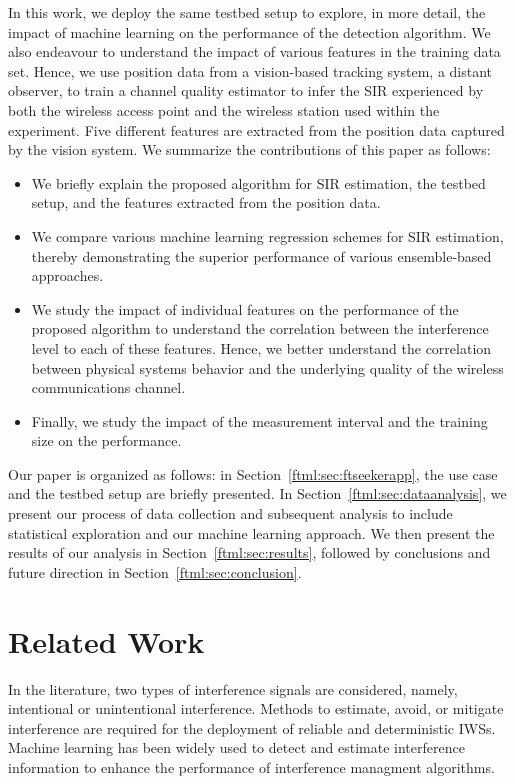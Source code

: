     In this work, we deploy the same testbed setup to explore, in more detail, the impact of machine learning on the performance of the detection algorithm.  We also endeavour to understand the impact of various features in the training data set. Hence, we use position data from a vision-based tracking system, a distant observer, to train a channel quality estimator to infer the SIR experienced by both the wireless access point and the wireless station used within the experiment. Five different features are extracted from the position data captured by the vision system. We summarize the contributions of this paper as follows:
    \begin{itemize}
        \item We briefly explain the proposed algorithm for SIR estimation, the testbed setup, and the features extracted from the position data.
        \item We compare various machine learning regression schemes for SIR estimation, thereby demonstrating the superior performance of various ensemble-based approaches.
        \item We study the impact of individual features on the performance of the proposed algorithm to understand the correlation between the interference level to each of these features. Hence, we better understand the correlation between physical systems behavior and the underlying quality of the wireless communications channel. 
        \item Finally, we study the impact of the measurement interval and the training size on the performance.
    \end{itemize}
    
    Our paper is organized as follows: in Section~\ref{ftml:sec:ftseekerapp}, the use case and the testbed setup are briefly presented. In Section~\ref{ftml:sec:dataanalysis}, we present our process of data collection and subsequent analysis to include statistical exploration and our machine learning approach. We then present the results of our analysis in Section~\ref{ftml:sec:results}, followed by conclusions and future direction in Section~\ref{ftml:sec:conclusion}.
    
\section{Related Work}    
In the literature, two types of interference signals are considered, namely, intentional or unintentional interference. Methods to estimate, avoid, or mitigate interference are required for the deployment of reliable and deterministic IWSs. Machine learning has been widely used to detect and estimate interference information to enhance the performance of interference managment algorithms.  
 
